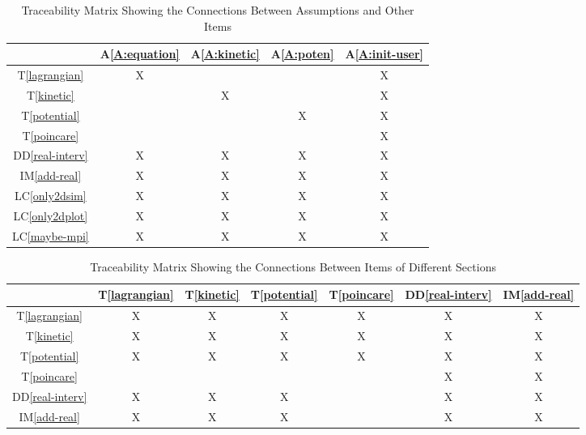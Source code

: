 \documentclass[12pt]{article}
\newcommand{\ddref}[1]{DD\ref{#1}}
\newcommand{\tref}[1]{T\ref{#1}}
\newcommand{\aref}[1]{A\ref{#1}}
\newcommand{\iref}[1]{IM\ref{#1}}
\newcommand{\lcref}[1]{LC\ref{#1}}
\begin{document}
\begin{table}[h!]
\centering
\label{Table:A_trace}
\begin{tabular}{|c|c|c|c|c|}
\hline
	& \aref{A:equation} 
	& \aref{A:kinetic}
	& \aref{A:poten}
	& \aref{A:init-user} \\
\hline
\tref{lagrangian} & X &  &  & X \\ \hline
\tref{kinetic} &  & X &  & X \\ \hline
\tref{potential} &  &  & X & X \\ \hline
\tref{poincare} &  &  &  & X \\ \hline
\ddref{real-interv} & X & X & X & X \\ \hline
\iref{add-real} & X & X & X & X \\ \hline
\lcref{only2dsim} & X & X & X & X \\ \hline
\lcref{only2dplot} & X & X & X & X \\ \hline
\lcref{maybe-mpi} & X & X & X & X\\ \hline
\end{tabular}
\caption{Traceability Matrix Showing the Connections Between Assumptions 
and Other Items}

\end{table}

\begin{table}[h]
	\centering
	\label{Table:trace}
	\begin{tabular}{|c|c|c|c|c|c|c|}
		\hline        
		& \tref{lagrangian}
		& \tref{kinetic}
		& \tref{potential}
		& \tref{poincare}
		& \ddref{real-interv}
		& \iref{add-real} \\
		\hline
        \tref{lagrangian} & X & X & X & X & X & X \\ \hline
        \tref{kinetic} & X & X & X & X & X & X\\ \hline
        \tref{potential} & X & X & X & X & X & X\\ \hline
        \tref{poincare} &  &  &  &  & X & X\\ \hline
        \ddref{real-interv} & X & X & X &  & X & X\\ \hline
        \iref{add-real} & X & X & X &  & X & X\\ \hline
	\end{tabular}
	\caption{Traceability Matrix Showing the Connections Between Items of 
	Different Sections}
\end{table}
\end{document}
